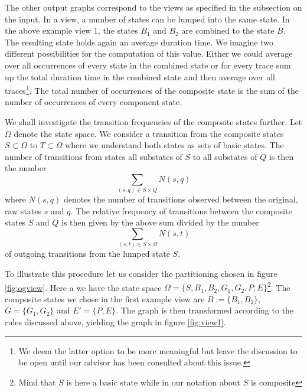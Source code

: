 The other output graphs correspond to the views as specified in the subsection on the input. In a view, a number of states can be lumped into the same state. In the above example view 1, the states $B_1$ and $B_2$ are combined to the state $B$. The resulting state holds again an average duration time. We imagine two different possibilities for the computation of this value. Either we could average over all occurrences of every state in the combined state or for every trace sum up the total duration time in the combined state and then average over all traces\footnote{We deem the latter option to be more meaningful but leave the discussion to be open until our advisor has been consulted about this issue.}. The total number of occurrences of the composite state is the sum of the number of occurrences of every component state. 



We shall investigate the transition frequencies of the composite states further. Let $\Omega$ denote the state space. We consider a transition from the composite states $S \subset \Omega$ to $T \subset \Omega$ where we understand both states as sets of basic states. The number of transitions from states all substates of $S$ to all substates of $Q$ is then the number
\[ 
    \sum_{(s,q) \in S \times Q} N(s,q)
\]
where $N(s,q)$ denotes the number of transitions observed between the original, raw states $s$ and $q$. The relative frequency of transitions between the composite states $S$ and $Q$ is then given by the above sum divided by the number
\[
    \sum_{(s,t) \in S \times \Omega} N(s,t)
\]
of outgoing transitions from the lumped state $S$.

To illustrate this procedure let us consider the partitioning chosen in figure \ref{fig:ogview}. Here a we have the state space $\Omega = \{ S, B_1, B_2, G_1, G_2, P, E \}$\footnote{Mind that $S$ is here a basic state while in our notation about $S$ is composite}. The composite states we chose in the first example view are $B := \{ B_1, B_2 \} $, $G = \{ G_1, G_2 \}$ and $E' = \{ P, E \}$. The graph is then transformed according to the rules discussed above, yielding the graph in figure \ref{fig:view1}.

